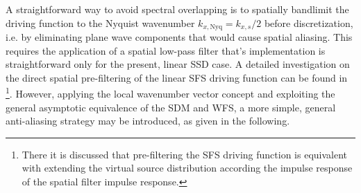 A straightforward way to avoid spectral overlapping is to spatially bandlimit the driving function to the Nyquist wavenumber $k_{x,\mathrm{Nyq}} = k_{x,s}/2$ before discretization, i.e. by eliminating plane wave components that would cause spatial aliasing.
This requires the application of a spatial low-pass filter that's implementation is straightforward only for the present, linear SSD case.
A detailed investigation on the direct spatial pre-filtering of the linear SFS driving function can be found in \cite{Firtha2012:isma, Ahrens2012} \footnote{There it is discussed that pre-filtering the SFS driving function is equivalent with extending the virtual source distribution according the impulse response of the spatial filter impulse response.}.
However, applying the local wavenumber vector concept and exploiting the general asymptotic equivalence of the SDM and WFS, a more simple, general anti-aliasing strategy may be introduced, as given in the following.

